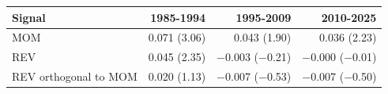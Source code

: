 \begin{tabular}{lrrr}
\toprule
Signal & 1985-1994 & 1995-2009 & 2010-2025 \\
\midrule
MOM & 0.071 (3.06) & 0.043 (1.90) & 0.036 (2.23) \\
REV & 0.045 (2.35) & $-$0.003 ($-$0.21) & $-$0.000 ($-$0.01) \\
REV orthogonal to MOM & 0.020 (1.13) & $-$0.007 ($-$0.53) & $-$0.007 ($-$0.50) \\
\bottomrule
\end{tabular}
